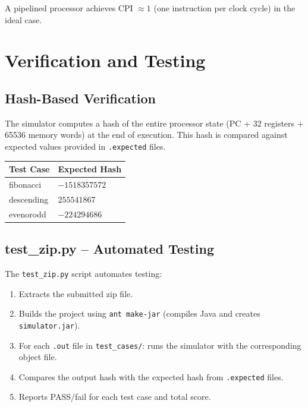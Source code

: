 \documentclass[12pt,a4paper]{article}
\begin{document}
A pipelined processor achieves CPI $\approx 1$ (one instruction per clock cycle) in the ideal case.

\section{Verification and Testing}

\subsection{Hash-Based Verification}

The simulator computes a hash of the entire processor state (PC + 32 registers + 65536 memory words) at the end of execution. This hash is compared against expected values provided in \texttt{.expected} files.

\begin{longtable}{p{3cm}p{6cm}}
\toprule
\textbf{Test Case} & \textbf{Expected Hash} \\
\midrule
fibonacci & $-1518357572$ \\
descending & $255541867$ \\
evenorodd & $-224294686$ \\
\bottomrule
\end{longtable}

\subsection{test\_zip.py -- Automated Testing}

The \texttt{test\_zip.py} script automates testing:

\begin{enumerate}
    \item Extracts the submitted zip file.
    \item Builds the project using \texttt{ant make-jar} (compiles Java and creates \texttt{simulator.jar}).
    \item For each \texttt{.out} file in \texttt{test\_cases/}: runs the simulator with the corresponding object file.
    \item Compares the output hash with the expected hash from \texttt{.expected} files.
    \item Reports PASS/fail for each test case and total score.
\end{enumerate}
\end{document}
